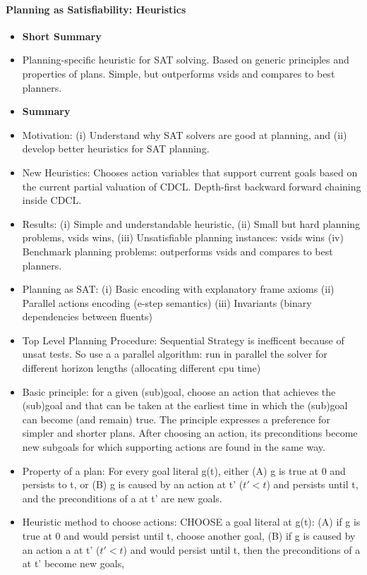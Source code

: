 \paragraph{Planning as Satisfiability: Heuristics \cite{rintanen12a}}
\begin{itemize}
	\item \textbf{Short Summary}
	\item Planning-specific heuristic for SAT solving. Based on generic principles and properties of plans. Simple, but outperforms vsids and compares to best planners.
	\item \textbf{Summary}
	\item Motivation: (i) Understand why SAT solvers are good at planning, and
				(ii) develop better heuristics for SAT planning.
	\item New Heuristics: Chooses action variables that support current 
				goals based on the current partial valuation of CDCL. 
				Depth-first backward forward chaining inside CDCL.
	\item Results: (i) Simple and understandable heuristic, 
				(ii) Small but hard planning problems, vsids wins, 
				(iii) Unsatisfiable planning instances: vsids wins
				(iv) Benchmark planning problems: outperforms vsids 
				and compares to best planners.
	\item Planning as SAT: (i) Basic encoding with explanatory frame axioms
				(ii) Parallel actions encoding (e-step semantics)
				(iii) Invariants (binary dependencies between fluents)
	\item Top Level Planning Procedure: Sequential Strategy is inefficent because of unsat tests. So use a a parallel algorithm:
	run in parallel the solver for different horizon lengths (allocating different cpu time)
	\item Basic principle: for a given (sub)goal, choose an action that achieves the (sub)goal and that can be taken at the earliest time in which the (sub)goal can become (and remain) true. The principle expresses a preference for simpler and shorter plans. After choosing an action, its preconditions become new subgoals for which supporting actions are found in the same way.
	\item Property of a plan: For every goal literal g(t), either 
				(A) g is true at 0 and persists to t, or
				(B) g is caused by an action at t' ($t'<t$) and persists until t, 
					and the preconditions of a at t' are new goals.
	\item Heuristic method to choose actions: CHOOSE a goal literal at g(t): (A) if g is true at 0 and would persist until t, choose another goal, (B) if g is caused by an action a at t' ($t'<t$) and would persist until t, then the preconditions of a at t' become new goals, 

\end{itemize}
